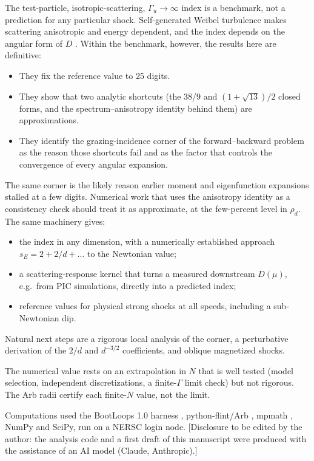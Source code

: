 \documentclass[aps,prd,twocolumn,superscriptaddress,nofootinbib,floatfix]{revtex4-2}
\begin{document}
The test-particle, isotropic-scattering, $\Gamma_u\to\infty$ index is a benchmark, not a prediction for any
particular shock. Self-generated Weibel turbulence makes scattering anisotropic and energy dependent, and the
index depends on the angular form of $D$ \cite{KGGA2000,NagarKeshet2021}. Within the benchmark, however, the
results here are definitive:
\begin{itemize}
\item They fix the reference value to 25 digits.
\item They show that two analytic shortcuts (the 38/9 and $(1+\sqrt{13})/2$ closed forms, and the
  spectrum--anisotropy identity behind them) are approximations.
\item They identify the grazing-incidence corner of the forward--backward problem as the reason those shortcuts
  fail and as the factor that controls the convergence of every angular expansion.
\end{itemize}
The same corner is the likely reason earlier moment and eigenfunction expansions stalled at a few digits. Numerical work
that uses the anisotropy identity as a consistency check \cite{KeshetWaxman2005} should treat it as approximate,
at the few-percent level in $\rho_d$. The same machinery gives:
\begin{itemize}
\item the index in any dimension, with a numerically established approach $s_E=2+2/d+\ldots$ to the Newtonian value;
\item a scattering-response kernel that turns a measured downstream $D(\mu)$, e.g.\ from PIC simulations, directly
  into a predicted index;
\item reference values for physical strong shocks at all speeds, including a
  sub-Newtonian dip.
\end{itemize}
Natural next steps are a rigorous local analysis of the corner, a perturbative derivation of the $2/d$ and
$d^{-3/2}$ coefficients, and oblique magnetized shocks.

The numerical value rests on an extrapolation in $N$ that is well tested (model selection, independent
discretizations, a finite-$\Gamma$ limit check) but not rigorous. The Arb radii certify each finite-$N$ value,
not the limit.

\begin{acknowledgments}
Computations used the BootLoops 1.0 harness \cite{BootLoops}, python-flint/Arb \cite{Johansson2017}, mpmath
\cite{mpmath}, NumPy and SciPy, run on a NERSC login node. [Disclosure to be edited by the author: the analysis code
and a first draft of this manuscript were produced with the assistance of an AI model (Claude, Anthropic).]
\end{acknowledgments}
\end{document}
